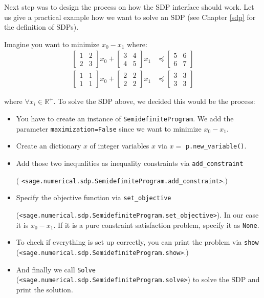 Next step was to design the process on how the SDP interface should work. Let us give a practical example how we want to solve an SDP (see Chapter \ref{sdp} for the definition of SDPs).
 
Imagine you want to minimize $x_0 - x_1$ where:
\begin{align}
\left[\begin{matrix} 1 & 2  \\ 2 & 3  \end{matrix}\right]  x_0 +  \left[\begin{matrix} 3 & 4  \\ 4 & 5  \end{matrix}\right]  x_1 &\preceq   \left[\begin{matrix} 5 & 6  \\ 6 & 7  \end{matrix}\right] \\ 
\left[\begin{matrix} 1 & 1  \\ 1 & 1  \end{matrix}\right]  x_0 +  \left[ \begin{matrix} 2 & 2  \\ 2 & 2  \end{matrix}\right]  x_1 &\preceq   \left[\begin{matrix} 3 & 3  \\ 3 & 3  \end{matrix}\right] 
\end{align}


where $\forall x_i \in \mathbb{R}^+$.  To solve the SDP above, we decided this would be the process:

\begin{itemize}
  \item You have to create an instance of \texttt{SemidefiniteProgram}. We
     add the parameter \texttt{maximization=False} since we want to minimize $x_0 - x_1$.

  \item Create an dictionary $x$ of integer variables $x$ via $x =$
  \texttt{p.new\_variable()}.
  \item Add those two inequalities as inequality constraints via
     \texttt{add\_constraint} 
     
     ( \texttt{<sage.numerical.sdp.SemidefiniteProgram.add\_constraint>}.)

  \item Specify the objective function via \texttt{set\_objective}
  
   (\texttt{<sage.numerical.sdp.SemidefiniteProgram.set\_objective>}).
     In our case it is  $x_0 - x_1$. If it
     is a pure constraint satisfaction problem, specify it as \texttt{None}.

  \item To check if everything is set up correctly, you can print the problem via
     \texttt{show} (\texttt{<sage.numerical.sdp.SemidefiniteProgram.show>}.)

  \item And finally we call \texttt{Solve} (\texttt{<sage.numerical.sdp.SemidefiniteProgram.solve>}) to solve the SDP and print the
  solution.
\end{itemize}


